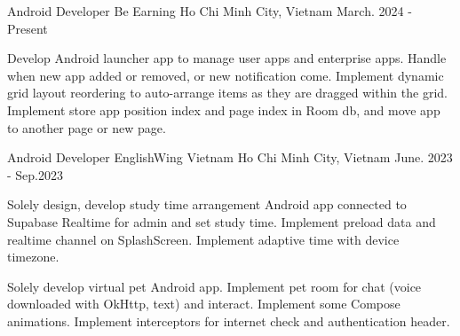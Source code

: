 \begin{cventries}

    \cventry
    {Android Developer}
    {Be Earning}
    {Ho Chi Minh City, Vietnam}
    {March. 2024 - Present}
    {
        \begin{cvitems}
            \item {
                Develop Android launcher app to manage user apps and enterprise apps.
                Handle when new app added or removed, or new notification come.
                Implement dynamic grid layout reordering to auto-arrange items as they are dragged within the grid.
                Implement store app position index and page index in Room db, and move app to another page or new page.
            }
        \end{cvitems}
    }

    \cventry
    {Android Developer}
    {EnglishWing Vietnam}
    {Ho Chi Minh City, Vietnam}
    {June. 2023 - Sep.2023}
    {
        \begin{cvitems}
            \item {
                Solely design, develop study time arrangement Android app connected to Supabase Realtime for admin and set study time.
                Implement preload data and realtime channel on SplashScreen.
                Implement adaptive time with device timezone.
            }
            \item {
                Solely develop virtual pet Android app.
                Implement pet room for chat (voice downloaded with OkHttp, text) and interact.
                Implement some Compose animations.
                Implement interceptors for internet check and authentication header.
            }
        \end{cvitems}
    }
\end{cventries}
